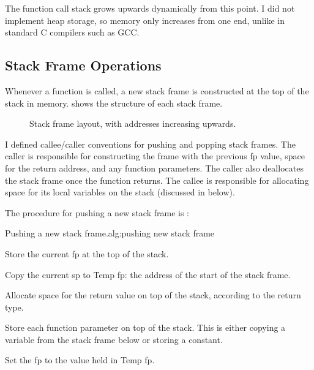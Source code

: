 \documentclass[00-main.tex]{subfiles}
\begin{document}
The function call stack grows upwards dynamically from this point.
I did not implement heap storage, so memory only increases from one end, unlike in standard C compilers such as GCC\@.

\subsection{Stack Frame Operations}

Whenever a function is called, a new stack frame is constructed at the top of the stack in memory.
 shows the structure of each stack frame.

\begin{figure}[t]
  \centering
  \caption{Stack frame layout, with addresses increasing upwards.}
  \label{fig:stack frame layout} %
\end{figure}

I defined callee/caller conventions for pushing and popping stack frames.
The caller is responsible for constructing the frame with the previous \gls{fp} value, space for the return address, and any function parameters.
The caller also deallocates the stack frame once the function returns.
The callee is responsible for allocating space for its local variables on the stack (discussed in  below).

The procedure for pushing a new stack frame is :

\begin{Algorithm}{Pushing a new stack frame.}{alg:pushing new stack frame}
\begin{EnumerateAlgorithm}
\item
Store the current \gls{fp} at the top of the stack.
\item
Copy the current \gls{sp} to Temp \gls{fp}: the address of the start of the stack frame.
\item
Allocate space for the return value on top of the stack, according to the return type.
\item
Store each function parameter on top of the stack.
This is either copying a variable from the stack frame below or storing a constant.
\item
Set the \gls{fp} to the value held in Temp \gls{fp}.
\end{EnumerateAlgorithm}
\end{Algorithm}
\end{document}
